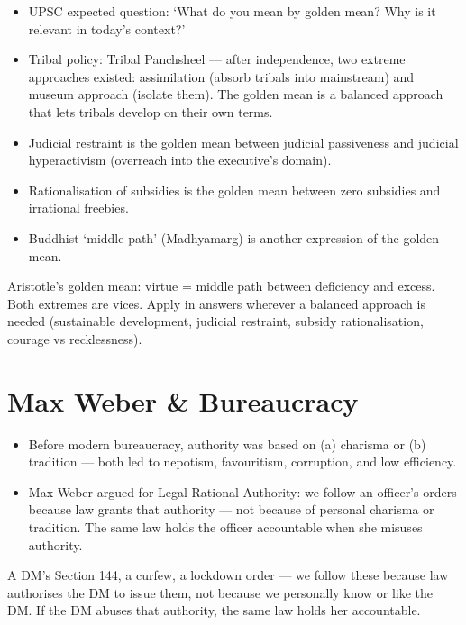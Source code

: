 \begin{PYQLink}
\begin{itemize}
\item UPSC expected question: `What do you mean by golden mean? Why is it relevant in today's context?'
\item Tribal policy: Tribal Panchsheel --- after independence, two extreme approaches existed: assimilation (absorb tribals into mainstream) and museum approach (isolate them). The golden mean is a balanced approach that lets tribals develop on their own terms.
\item Judicial restraint is the golden mean between judicial passiveness and judicial hyperactivism (overreach into the executive's domain).
\item Rationalisation of subsidies is the golden mean between zero subsidies and irrational freebies.
\item Buddhist `middle path' (Madhyamarg) is another expression of the golden mean.
\end{itemize}
\end{PYQLink}

\begin{QuickRevision}
Aristotle's golden mean: virtue = middle path between deficiency and excess. Both extremes are vices. Apply in answers wherever a balanced approach is needed (sustainable development, judicial restraint, subsidy rationalisation, courage vs recklessness).
\end{QuickRevision}

\section{Max Weber \& Bureaucracy}

\begin{KeyConcept}
\begin{itemize}
\item Before modern bureaucracy, authority was based on (a) charisma or (b) tradition --- both led to nepotism, favouritism, corruption, and low efficiency.
\item Max Weber argued for Legal-Rational Authority: we follow an officer's orders because law grants that authority --- not because of personal charisma or tradition. The same law holds the officer accountable when she misuses authority.
\end{itemize}
\end{KeyConcept}

\begin{ExampleBox}
A DM's Section 144, a curfew, a lockdown order --- we follow these because law authorises the DM to issue them, not because we personally know or like the DM. If the DM abuses that authority, the same law holds her accountable.
\end{ExampleBox}

